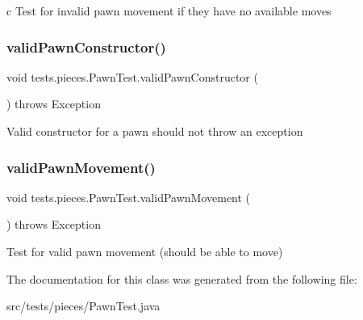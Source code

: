 c Test for invalid pawn movement if they have no available moves \hypertarget{classtests_1_1pieces_1_1_pawn_test_a1c358f83062c1dcf97841cc61549d8f4}{}\label{classtests_1_1pieces_1_1_pawn_test_a1c358f83062c1dcf97841cc61549d8f4} 
\subsubsection{\texorpdfstring{valid\+Pawn\+Constructor()}{validPawnConstructor()}}
{\footnotesize\ttfamily void tests.\+pieces.\+Pawn\+Test.\+valid\+Pawn\+Constructor (\begin{DoxyParamCaption}{ }\end{DoxyParamCaption}) throws Exception}

Valid constructor for a pawn should not throw an exception \hypertarget{classtests_1_1pieces_1_1_pawn_test_a5f368d440aae4e9b128ed3a11b70bbc7}{}\label{classtests_1_1pieces_1_1_pawn_test_a5f368d440aae4e9b128ed3a11b70bbc7} 
\subsubsection{\texorpdfstring{valid\+Pawn\+Movement()}{validPawnMovement()}}
{\footnotesize\ttfamily void tests.\+pieces.\+Pawn\+Test.\+valid\+Pawn\+Movement (\begin{DoxyParamCaption}{ }\end{DoxyParamCaption}) throws Exception}

Test for valid pawn movement (should be able to move) 

The documentation for this class was generated from the following file\+:\begin{DoxyCompactItemize}
\item 
src/tests/pieces/Pawn\+Test.\+java\end{DoxyCompactItemize}
